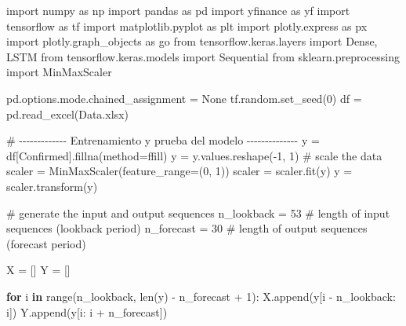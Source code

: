\documentclass[
  us-letterpaper,
]{scrreprt}
\newenvironment{Shaded}{\begin{snugshade}}{\end{snugshade}}
\newcommand{\BuiltInTok}[1]{\textcolor[rgb]{0.00,0.23,0.31}{#1}}
\newcommand{\CommentTok}[1]{\textcolor[rgb]{0.37,0.37,0.37}{#1}}
\newcommand{\ControlFlowTok}[1]{\textcolor[rgb]{0.00,0.23,0.31}{\textbf{#1}}}
\newcommand{\DecValTok}[1]{\textcolor[rgb]{0.68,0.00,0.00}{#1}}
\newcommand{\ImportTok}[1]{\textcolor[rgb]{0.00,0.46,0.62}{#1}}
\newcommand{\KeywordTok}[1]{\textcolor[rgb]{0.00,0.23,0.31}{\textbf{#1}}}
\newcommand{\NormalTok}[1]{\textcolor[rgb]{0.00,0.23,0.31}{#1}}
\newcommand{\OperatorTok}[1]{\textcolor[rgb]{0.37,0.37,0.37}{#1}}
\newcommand{\StringTok}[1]{\textcolor[rgb]{0.13,0.47,0.30}{#1}}
\newcommand{\VariableTok}[1]{\textcolor[rgb]{0.07,0.07,0.07}{#1}}
\theoremstyle{plain}
\theoremstyle{definition}
\theoremstyle{definition}
\theoremstyle{plain}
\theoremstyle{remark}
\begin{document}
\begin{Shaded}
\begin{Highlighting}[]
\ImportTok{import}\NormalTok{ numpy }\ImportTok{as}\NormalTok{ np}
\ImportTok{import}\NormalTok{ pandas }\ImportTok{as}\NormalTok{ pd}
\ImportTok{import}\NormalTok{ yfinance }\ImportTok{as}\NormalTok{ yf}
\ImportTok{import}\NormalTok{ tensorflow }\ImportTok{as}\NormalTok{ tf}
\ImportTok{import}\NormalTok{ matplotlib.pyplot }\ImportTok{as}\NormalTok{ plt}
\ImportTok{import}\NormalTok{ plotly.express }\ImportTok{as}\NormalTok{ px}
\ImportTok{import}\NormalTok{ plotly.graph\_objects }\ImportTok{as}\NormalTok{ go}
\ImportTok{from}\NormalTok{ tensorflow.keras.layers }\ImportTok{import}\NormalTok{ Dense, LSTM}
\ImportTok{from}\NormalTok{ tensorflow.keras.models }\ImportTok{import}\NormalTok{ Sequential}
\ImportTok{from}\NormalTok{ sklearn.preprocessing }\ImportTok{import}\NormalTok{ MinMaxScaler}

\NormalTok{pd.options.mode.chained\_assignment }\OperatorTok{=} \VariableTok{None}
\NormalTok{tf.random.set\_seed(}\DecValTok{0}\NormalTok{)}
\NormalTok{df }\OperatorTok{=}\NormalTok{ pd.read\_excel(}\StringTok{\textquotesingle{}Data.xlsx\textquotesingle{}}\NormalTok{)}

\CommentTok{\# {-}{-}{-}{-}{-}{-}{-}{-}{-}{-}{-}{-}{-} Entrenamiento y prueba del modelo {-}{-}{-}{-}{-}{-}{-}{-}{-}{-}{-}{-}{-}{-}}
\NormalTok{y }\OperatorTok{=}\NormalTok{ df[}\StringTok{\textquotesingle{}Confirmed\textquotesingle{}}\NormalTok{].fillna(method}\OperatorTok{=}\StringTok{\textquotesingle{}ffill\textquotesingle{}}\NormalTok{)}
\NormalTok{y }\OperatorTok{=}\NormalTok{ y.values.reshape(}\OperatorTok{{-}}\DecValTok{1}\NormalTok{, }\DecValTok{1}\NormalTok{)}
\CommentTok{\# scale the data}
\NormalTok{scaler }\OperatorTok{=}\NormalTok{ MinMaxScaler(feature\_range}\OperatorTok{=}\NormalTok{(}\DecValTok{0}\NormalTok{, }\DecValTok{1}\NormalTok{))}
\NormalTok{scaler }\OperatorTok{=}\NormalTok{ scaler.fit(y)}
\NormalTok{y }\OperatorTok{=}\NormalTok{ scaler.transform(y)}

\CommentTok{\# generate the input and output sequences}
\NormalTok{n\_lookback }\OperatorTok{=} \DecValTok{53}  \CommentTok{\# length of input sequences (lookback period)}
\NormalTok{n\_forecast }\OperatorTok{=} \DecValTok{30}  \CommentTok{\# length of output sequences (forecast period)}

\NormalTok{X }\OperatorTok{=}\NormalTok{ []}
\NormalTok{Y }\OperatorTok{=}\NormalTok{ []}

\ControlFlowTok{for}\NormalTok{ i }\KeywordTok{in} \BuiltInTok{range}\NormalTok{(n\_lookback, }\BuiltInTok{len}\NormalTok{(y) }\OperatorTok{{-}}\NormalTok{ n\_forecast }\OperatorTok{+} \DecValTok{1}\NormalTok{):}
\NormalTok{    X.append(y[i }\OperatorTok{{-}}\NormalTok{ n\_lookback: i])}
\NormalTok{    Y.append(y[i: i }\OperatorTok{+}\NormalTok{ n\_forecast])}


\end{Highlighting}
\end{Shaded}
\end{document}
